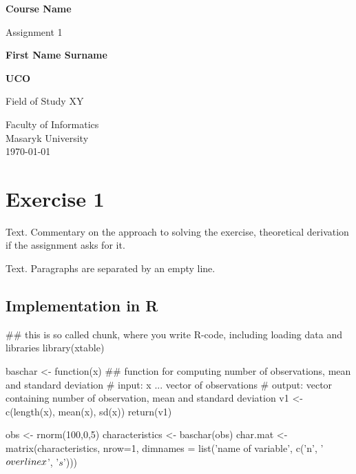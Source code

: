 \documentclass[12pt, oneside]{report}\usepackage[]{graphicx}\usepackage[]{color}
\begin{document}
\begin{titlepage}
    \begin{center}
        \vspace*{1cm}
        
        \Huge
          \textbf{Course Name} %
        
        \vspace{0.5cm}
        \LARGE
        Assignment 1 %
        
        \vspace{1.5cm}
        
        \textbf{First Name Surname} %
   		  \vspace{1.5cm}
        
        \textbf{UCO} %
       
        \vfill
        
        Field of Study XY %
        
        \vspace{0.8cm}
          \Large
        Faculty of Informatics\\
        Masaryk University\\
        \vspace{0.5cm}
       \today
        
    \end{center}
\end{titlepage}


\section*{Exercise 1}
\noindent Text. Commentary on the approach to solving the exercise, theoretical derivation if the assignment asks for it.

Text. Paragraphs are separated by an empty line.

\subsection*{Implementation in R}

\begin{Schunk}
\begin{Sinput}
## this is so called chunk, where you write R-code, including loading data and libraries
library(xtable)

baschar <- function(x){
  ## function for computing number of observations, mean and standard deviation
  # input: x ... vector of observations
  # output: vector containing number of observation, mean and standard deviation
  v1 <- c(length(x), mean(x), sd(x))
  return(v1)
}

obs <- rnorm(100,0,5)
characteristics <- baschar(obs)
char.mat <- matrix(characteristics, nrow=1, dimnames = list('name of variable', c('n', '$\\overline{x}$', '$s$')))
\end{Sinput}
\end{Schunk}
\end{document}
